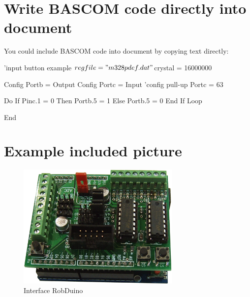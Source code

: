 \documentclass[10pt,a4paper]{article}
\begin{document}
\section{Write BASCOM code directly into document}
You could include BASCOM code into document by copying text directly:

\begin{Bascomlisting}
'input button example
$regfile = "m328pdef.dat"
$crystal = 16000000

Config Portb = Output
Config Portc = Input
'config pull-up
Portc = 63

Do
   If Pinc.1 = 0 Then
      Portb.5 = 1
   Else
      Portb.5 = 0
   End If
Loop

End
\end{Bascomlisting}
\newpage
\section{Example included picture}
\begin{figure}[h!] \centering
 \includegraphics[width=8cm]{pictures/RobDuino.png}
 \caption{Interface RobDuino}
  \label{slika:robduino}
\end{figure}
\newpage
\end{document}
